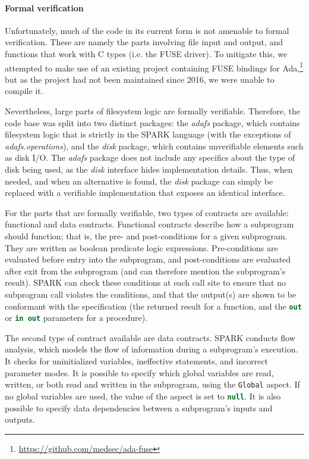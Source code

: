 \paragraph{Formal verification}
Unfortunately, much of the code in its current form is not amenable to formal verification.
These are namely the parts involving file input and output, and functions that work with C types (i.e. the FUSE driver).
To mitigate this, we attempted to make use of an existing project containing FUSE bindings for Ada,\footnote{\url{https://github.com/medsec/ada-fuse}} but as the project had not been maintained since 2016, we were unable to compile it.

Nevertheless, large parts of filesystem logic are formally verifiable.
Therefore, the code base was split into two distinct packages: the \textit{adafs} package, which contains filesystem logic that is strictly in the SPARK language (with the exceptions of \textit{adafs.operations}), and the \textit{disk} package, which contains unverifiable elements such as disk I/O.
The \textit{adafs} package does not include any specifics about the type of disk being used, as the \textit{disk} interface hides implementation details.
Thus, when needed, and when an alternative is found, the \textit{disk} package can simply be replaced with a verifiable implementation that exposes an identical interface.

For the parts that are formally verifiable, two types of contracts are available: functional and data contracts.
Functional contracts describe how a subprogram should function; that is, the pre- and post-conditions for a given subprogram.
They are written as boolean predicate logic expressions.
Pre-conditions are evaluated before entry into the subprogram, and post-conditions are evaluated after exit from the subprogram (and can therefore mention the subprogram's result).
SPARK can check these conditions at each call site to ensure that no subprogram call violates the conditions, and that the output(s) are shown to be conformant with the specification (the returned result for a function, and the \lstinline[language=Ada]{out} or \lstinline[language=Ada]{in out} parameters for a procedure).

The second type of contract available are data contracts.
SPARK conducts flow analysis, which models the flow of information during a subprogram's execution.
It checks for uninitialized variables, ineffective statements, and incorrect parameter modes.
It is possible to specify which global variables are read, written, or both read and written in the subprogram, using the \lstinline[language=Ada]{Global} aspect.
If no global variables are used, the value of the aspect is set to \lstinline[language=Ada]{null}.
It is also possible to specify data dependencies between a subprogram's inputs and outputs.

